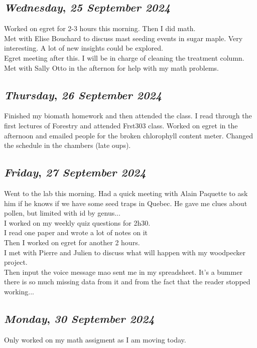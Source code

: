 \def\day{\textit{25 September 2024}}
\def\weekday{\textit{Wednesday}}
\subsection*{\weekday, \day}
Worked on egret for 2-3 hours this morning. Then I did math.\\
Met with Elise Bouchard to discuss mast seeding events in sugar maple. Very interesting. A lot of new insights could be explored. \\
Egret meeting after this. I will be in charge of cleaning the treatment column.\\ 
Met with Sally Otto in the afternon for help with my math problems. 

\def\day{\textit{26 September 2024}}
\def\weekday{\textit{Thursday}}
\subsection*{\weekday, \day}
Finished my biomath homework and then attended the class. I read through the first lectures of Forestry and attended Frst303 class. Worked on egret in the afternoon and emailed people for the broken chlorophyll content meter. Changed the schedule in the chambers (late oups). 

\def\day{\textit{27 September 2024}}
\def\weekday{\textit{Friday}}
\subsection*{\weekday, \day}
Went to the lab this morning. Had a quick meeting with Alain Paquette to ask him if he knows if we have some seed traps in Quebec. He gave me clues about pollen, but limited with id by genus...\\
I worked on my weekly quiz questions for 2h30. \\
I read one paper and wrote a lot of notes on it\\
Then I worked on egret for another 2 hours.\\
I met with Pierre and Julien to discuss what will happen with my woodpecker project. \\
Then input the voice message mao sent me in my spreadsheet. It's a bummer there is so much missing data from it and from the fact that the reader stopped working...

\def\day{\textit{30 September 2024}}
\def\weekday{\textit{Monday}}
\subsection*{\weekday, \day}
Only worked on my math assigment as I am moving today. 